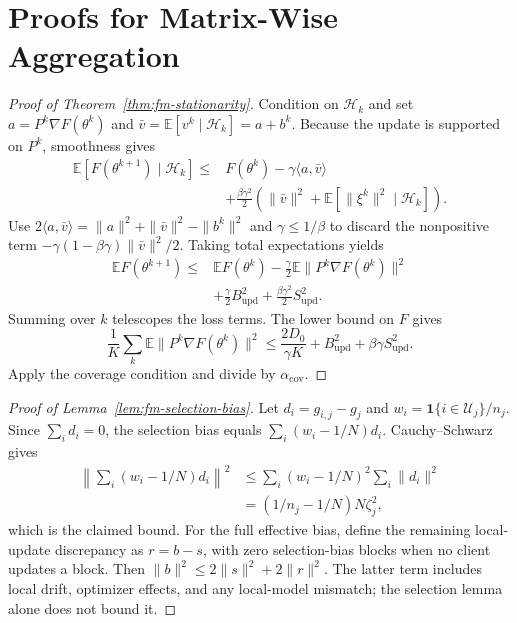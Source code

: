 \documentclass[10pt,conference,letterpaper]{IEEEtran}
\begin{document}
\appendices
\section{Proofs for Matrix-Wise Aggregation}
\label{app:fm-convergence}
\begin{proof}[Proof of Theorem~\ref{thm:fm-stationarity}]
Condition on $\mathcal H_k$ and set $a=P^k\nabla F(\theta^k)$ and
$\bar v=\mathbb E[v^k\mid\mathcal H_k]=a+b^k$.
Because the update is supported on $P^k$, smoothness gives
\begin{align}
 \mathbb E[F(\theta^{k+1})\mid\mathcal H_k]
 \le{}&F(\theta^k)-\gamma\langle a,\bar v\rangle\\
 &+\frac{\beta\gamma^2}{2}
 \left(\|\bar v\|^2+\mathbb E[\|\xi^k\|^2\mid\mathcal H_k]\right).\nonumber
\end{align}
Use $2\langle a,\bar v\rangle=\|a\|^2+\|\bar v\|^2-\|b^k\|^2$ and
$\gamma\le1/\beta$ to discard the nonpositive term
$-\gamma(1-\beta\gamma)\|\bar v\|^2/2$. Taking total expectations yields
\begin{align}
 \mathbb E F(\theta^{k+1})\le{}&\mathbb E F(\theta^k)
 -\frac\gamma2\mathbb E\|P^k\nabla F(\theta^k)\|^2\\
 &+\frac\gamma2B_{\mathrm{upd}}^2
 +\frac{\beta\gamma^2}{2}S_{\mathrm{upd}}^2.\nonumber
\end{align}
Summing over $k$ telescopes the loss terms. The lower bound on $F$ gives
\begin{equation}
 \frac1K\sum_k\mathbb E\|P^k\nabla F(\theta^k)\|^2
 \le\frac{2D_0}{\gamma K}+B_{\mathrm{upd}}^2+\beta\gamma S_{\mathrm{upd}}^2.
\end{equation}
Apply the coverage condition and divide by $\alpha_{\mathrm{cov}}$.
\end{proof}

\begin{proof}[Proof of Lemma~\ref{lem:fm-selection-bias}]
Let $d_i=g_{i,j}-g_j$ and $w_i=\mathbf1\{i\in\mathcal U_j\}/n_j$.
Since $\sum_i d_i=0$, the selection bias equals $\sum_i(w_i-1/N)d_i$.
Cauchy--Schwarz gives
\begin{align}
 \left\|\sum_i(w_i-1/N)d_i\right\|^2
 &\le\sum_i(w_i-1/N)^2\sum_i\|d_i\|^2\\
 &=(1/n_j-1/N)N\zeta_j^2,
\end{align}
which is the claimed bound. For the full effective bias, define the remaining local-update discrepancy as $r=b-s$, with zero selection-bias blocks when no client updates a block. Then $\|b\|^2\le2\|s\|^2+2\|r\|^2$. The latter term includes local drift, optimizer effects, and any local-model mismatch; the selection lemma alone does not bound it.
\end{proof}
\end{document}
